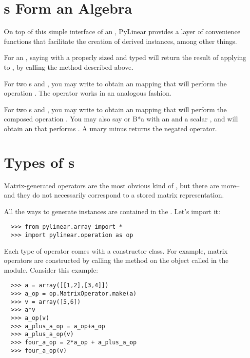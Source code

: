\section{s Form an Algebra}

On top of this simple interface of an , PyLinear 
provides a layer of convenience functions that facilitate the
creation of derived instances, among other things.

\opindex{()}For an  , saying 
with a properly sized and typed   will
return the result of applying  to , by calling the
 method described above.

\opindex{+}For two s  and , you may write
 to obtain an  mapping that will
perform the operation . The operator \code{-} works
in an analogous fashion.

\opindex{*}For two s  and , you may
write  to obtain an  mapping that will
perform the composed operation . You may also say
 or {B*a} with an   and a scalar
, and will obtain an  that performs
. A unary minus  returns the negated
operator.

\section{Types of s}

Matrix-generated operators are the most obvious kind of , but
there are more--and they do not necessarily correspond to a stored matrix
representation.

All the ways to generate  instances are contained 
in the . Let's import it:
\begin{verbatim}
  >>> from pylinear.array import *
  >>> import pylinear.operation as op
\end{verbatim}

Each type of operator comes with a constructor class. For example,
matrix operators are constructed by calling the method 
on the object called  in the  
module. Consider this example:
\begin{verbatim}
  >>> a = array([[1,2],[3,4]])
  >>> a_op = op.MatrixOperator.make(a)
  >>> v = array([5,6])
  >>> a*v
  >>> a_op(v)
  >>> a_plus_a_op = a_op+a_op
  >>> a_plus_a_op(v)
  >>> four_a_op = 2*a_op + a_plus_a_op
  >>> four_a_op(v)
\end{verbatim}

